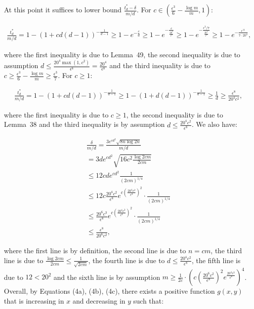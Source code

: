 \documentclass[10pt,a4paper]{article}
\begin{document}
At this point it suffices to lower bound $\frac{t^{*}_{d}-\delta}{m/d}$.
For $c\in\left(\frac{\epsilon^{3}}{6}-\frac{\log{m}}{m},1\right)$:\par


\[\begin{gathered}
\displaystyle\frac{t^{*}_{d}}{m/d}=1-\left(1+cd(d-1)\right)^{-\frac{1}{d-1}}\geq 1-e^{-\frac{c}{d}}\geq 1-e^{-\frac{c}{\frac{20^{4}}{\epsilon^{8}}}}\geq 1-e^{-\frac{\epsilon^{3}/7}{\frac{20^{4}}{\epsilon^{8}}}}\geq 1-e^{-\frac{\epsilon^{11}}{7\cdot 20^{4}}},
\end{gathered}\]


where the first inequality is due to Lemma 49, the second inequality is due to assumption $d\leq\frac{20^{4}\max(1,c^{2})}{\epsilon^{8}}=\frac{20^{4}}{\epsilon^{8}}$ and the third inequality is due to $c\geq\frac{\epsilon^{3}}{6}-\frac{\log{m}}{m}\geq\frac{\epsilon^{3}}{7}$.
For $c\geq 1$:\par


\[\begin{gathered}
\displaystyle\frac{t^{*}_{d}}{m/d}=1-\left(1+cd(d-1)\right)^{-\frac{1}{d-1}}\geq 1-\left(1+d(d-1)\right)^{-\frac{1}{d-1}}\geq\frac{1}{d}\geq\frac{\epsilon^{8}}{20^{4}c^{2}},
\end{gathered}\]


where the first inequality is due to $c\geq 1$, the second inequality is due to Lemma 38 and the third inequality is by assumption $d\leq\frac{20^{4}c^{2}}{\epsilon^{8}}$.
We also have:\par


\[\begin{gathered}
\displaystyle\frac{\delta}{m/d} \displaystyle=\frac{3e^{cd^{2}}\sqrt{8n\log{2n}}}{m/d} \\
\displaystyle=3de^{cd^{2}}\sqrt{16c^{2}\frac{\log{2cm}}{2cm}} \\
\displaystyle\leq 12cde^{cd^{2}}\frac{1}{(2cm)^{1/4}} \\
\displaystyle\leq 12c\frac{20^{4}c^{2}}{\epsilon^{8}}e^{c\left(\frac{20^{4}c^{2}}{\epsilon^{8}}\right)^{2}}\cdot\frac{1}{(2cm)^{1/4}} \\
\displaystyle\leq\frac{20^{6}c^{3}}{\epsilon^{8}}e^{c\left(\frac{20^{4}c^{2}}{\epsilon^{8}}\right)^{2}}\cdot\frac{1}{(2cm)^{1/4}} \\
\displaystyle\leq\frac{\epsilon^{8}}{20^{6}c^{2}},
\end{gathered}\]


where the first line is by definition, the second line is due to $n=cm$, the third line is due to $\frac{\log{2cm}}{2cm}\leq\frac{1}{\sqrt{2cm}}$, the fourth line is due to $d\leq\frac{20^{4}c^{2}}{\epsilon^{8}}$, the fifth line is due to $12<20^{2}$ and the sixth line is by assumption $m\geq\frac{1}{2c}\cdot\left(c\left(\frac{20^{6}c^{2}}{\epsilon^{8}}\right)^{2}e^{\frac{20^{4}c^{3}}{\epsilon^{8}}}\right)^{4}$.
Overall, by Equations (4a), (4b), (4c), there exists a positive function $g(x,y)$ that is increasing in $x$ and decreasing in $y$ such that:\par
\end{document}
